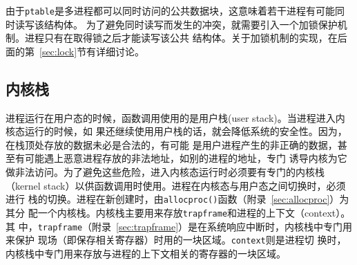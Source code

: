 \documentclass{swfcthesismscctex}
\begin{document}
由于\texttt{ptable}是多进程都可以同时访问的公共数据块，这意味着若干进程有可能同时读写该结构体。
为了避免同时读写而发生的冲突，就需要引入一个加锁保护机制。进程只有在取得锁之后才能读写该公共
结构体。关于加锁机制的实现，在后面的第~\ref{sec:lock}节有详细讨论。

\subsection{内核栈}

进程运行在用户态的时候，函数调用使用的是用户栈(user stack)。当进程进入内核态运行的时候，如
果还继续使用用户栈的话，就会降低系统的安全性。因为，在栈顶处存放的数据未必是合法的，有可能
是用户进程产生的非正确的数据，甚至有可能遇上恶意进程存放的非法地址，如别的进程的地址，专门
诱导内核为它做非法访问。为了避免这些危险，进入内核态运行时必须要有专门的内核栈（kernel
stack）以供函数调用时使用\cite{stack:kernelstack}。进程在内核态与用户态之间切换时，必须进行
栈的切换。进程在新创建时，由\texttt{allocproc()}函数（附录~\ref{sec:allocproc}）为其分
配一个内核栈。内核栈主要用来存放\texttt{trapframe}和进程的上下文（context）。其
中，\texttt{trapframe}（附录~\ref{sec:trapframe}）是在系统响应中断时，内核栈中专门用来保护
现场（即保存相关寄存器）时用的一块区域\cite{stack:kernelstack2}。\texttt{context}则是进程切
换时，内核栈中专门用来存放与进程的上下文相关的寄存器的一块区域。



\end{document}
